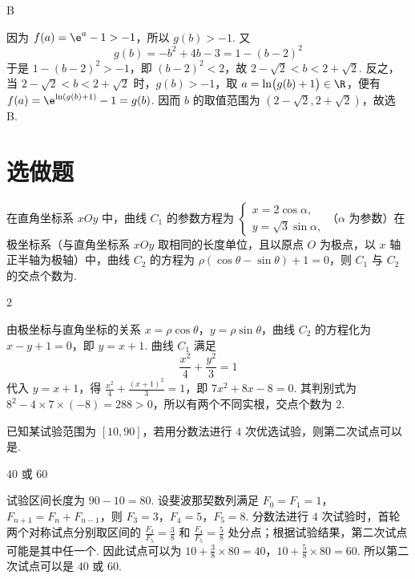 \begin{answer}
B
\end{answer}

\begin{solution}
因为 \(f(a)=\e^a-1>-1\)，所以 \(g(b)>-1\). 又
\[
g(b)=-b^2+4b-3=1-(b-2)^2
\]
于是 \(1-(b-2)^2>-1\)，即 \((b-2)^2<2\)，故
\(2-\sqrt2<b<2+\sqrt2\). 反之，当
\(2-\sqrt2<b<2+\sqrt2\) 时，\(g(b)>-1\)，取
\(a=\ln\bigl(g(b)+1\bigr)\in\R\)，便有
\(f(a)=\e^{\ln(g(b)+1)}-1=g(b)\). 因而
\(b\) 的取值范围为 \((2-\sqrt2,2+\sqrt2)\)，故选 B.
\end{solution}

\section{选做题}

\begin{problem}
在直角坐标系 \(xOy\) 中，曲线 \(C_1\) 的参数方程为 \(\begin{cases}
x = 2\cos \alpha,\\
y = \sqrt{3}\sin \alpha,
\end{cases}\)（\(\alpha\) 为参数）在极坐标系（与直角坐标系 \(xOy\) 取相同的长度单位，且以原点 \(O\) 为极点，以 \(x\) 轴正半轴为极轴）中，曲线 \(C_2\) 的方程为 \(\rho(\cos \theta - \sin \theta) + 1 = 0\)，则 \(C_1\) 与 \(C_2\) 的交点个数为\fillinblank{}.
\end{problem}

\begin{answer}
2
\end{answer}

\begin{solution}
由极坐标与直角坐标的关系 \(x=\rho\cos\theta\)，\(y=\rho\sin\theta\)，曲线 \(C_2\) 的方程化为
\(x-y+1=0\)，即 \(y=x+1\). 曲线 \(C_1\) 满足
\[
\frac{x^2}{4}+\frac{y^2}{3}=1
\]
代入 \(y=x+1\)，得
\(\frac{x^2}{4}+\frac{(x+1)^2}{3}=1\)，即
\(7x^2+8x-8=0\). 其判别式为
\(8^2-4\times7\times(-8)=288>0\)，所以有两个不同实根，交点个数为 \(2\).
\end{solution}

\begin{problem}
已知某试验范围为 \([10,90]\)，若用分数法进行 \(4\) 次优选试验，则第二次试点可以是\fillinblank{}.
\end{problem}

\begin{answer}
\(40\) 或 \(60\)
\end{answer}

\begin{solution}
试验区间长度为 \(90-10=80\). 设斐波那契数列满足
\(F_0=F_1=1\)，\(F_{n+1}=F_n+F_{n-1}\)，则
\(F_3=3\)，\(F_4=5\)，\(F_5=8\). 分数法进行 \(4\) 次试验时，首轮两个对称试点分别取区间的
\(\frac{F_3}{F_5}=\frac38\) 和 \(\frac{F_4}{F_5}=\frac58\) 处分点；根据试验结果，第二次试点可能是其中任一个. 因此试点可以为
\(10+\frac38\times80=40\)，\(10+\frac58\times80=60\).
所以第二次试点可以是 \(40\) 或 \(60\).
\end{solution}

